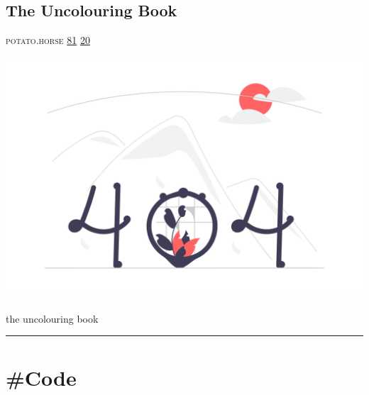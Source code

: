 \documentclass[10pt,a4paper]{article}
\begin{document}
\begin{multicols*}{2}
\begin{minipage}{\linewidth}
\subsection{The Uncolouring Book}
\textsc{\footnotesize
{\scriptsize\faGlobe}\space 
potato.horse 
{\scriptsize\faThumbsOUp}\space 
\href{http://news.ycombinator.com/item?id=37208248\&utm\_term=comment}{81} 
{\scriptsize\faComments}\space 
\href{http://news.ycombinator.com/item?id=37208248\&utm\_term=comment}{20} 
}
\par\medskip\noindent
\href{https://lines.potato.horse?utm\_source=hackernewsletter\&utm\_medium=email\&utm\_term=show\_hn}{
    \includegraphics[width=0.99\linewidth]{notfound.png}
}
\end{minipage}
\paragraph{}
the uncolouring book
\par\noindent\textcolor{red}{\rule{\linewidth}{0.2mm}}
\vfill
\null
\end{multicols*}

\newpage
\section{\#Code}
\end{document}

